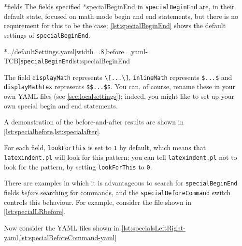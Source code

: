 *{fields}\label{yaml:specialBeginEnd}
	The fields specified
	*{specialBeginEnd} in \texttt{specialBeginEnd} are, in their default
	state, focused on math mode begin and end statements, but there is no requirement for
	this to be the case; \cref{lst:specialBeginEnd} shows the default settings of
	\texttt{specialBeginEnd}.

	\cmhlistingsfromfile[style=specialBeginEnd]*{../defaultSettings.yaml}[width=.8\linewidth,before=\centering,yaml-TCB]{\texttt{specialBeginEnd}}{lst:specialBeginEnd}

	The field \texttt{displayMath} represents \lstinline!\[...\]!, \texttt{inlineMath}
	represents
	\lstinline!$...$! and \texttt{displayMathTex} represents \lstinline!$$...$$!.
	You can, of course, rename these in your own YAML files (see \vref{sec:localsettings});
	indeed, you might like to set up your own special begin and end statements.

	A demonstration of the before-and-after results are shown in
	\cref{lst:specialbefore,lst:specialafter}.

	\begin{cmhtcbraster}
	\end{cmhtcbraster}

	For each field, \texttt{lookForThis} is set to \texttt{1} by default, which means that
	\texttt{latexindent.pl} will look for this pattern; you can tell \texttt{latexindent.pl}
	not to look for the pattern, by setting \texttt{lookForThis} to \texttt{0}.

	There are%
	examples in which it is advantageous to search for \texttt{specialBeginEnd} fields
	\emph{before} searching for commands, and the \texttt{specialBeforeCommand} switch
	controls this behaviour. For example, consider the file shown in
	\cref{lst:specialLRbefore}.


	Now consider the YAML files shown in
	\cref{lst:specialsLeftRight-yaml,lst:specialBeforeCommand-yaml}

